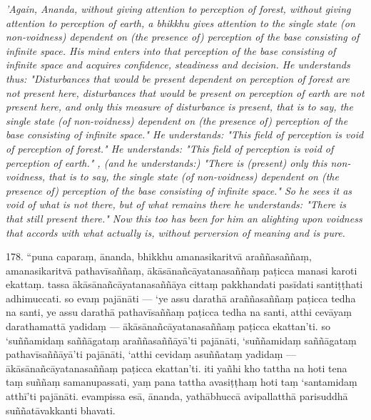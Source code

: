\documentclass[12pt]{article}
\begin{document}
\begin{paracol}{2}
\begin{column}
\begin{flushleft}
 \switchcolumn*
	\end{flushleft} 
{\itshape\footnotesize  'Again, Ananda, without giving attention to perception of forest, without giving attention to perception of earth, a bhikkhu gives attention to the single state (on non-voidness) dependent on (the presence of) perception of the base consisting of infinite space. His mind enters into that perception of the base consisting of infinite space and acquires confidence, steadiness and decision. He understands thus: "Disturbances that would be present dependent on perception of forest are not present here, disturbances that would be present on perception of earth are not present here, and only this measure of disturbance is present, that is to say, the single state (of non-voidness) dependent on (the presence of) perception of the base consisting of infinite space." He understands: "This field of perception is void of perception of forest." He understands: "This field of perception is void of perception of earth." , (and he understands:) "There is (present) only this non-voidness, that is to say, the single state (of non-voidness) dependent on (the presence of) perception of the base consisting of infinite space." So he sees it as void of what is not there, but of what remains there he understands: "There is that still present there." Now this too has been for him an alighting upon voidness that accords with what actually is, without perversion of meaning and is pure.}
\switchcolumn
 	\begin{flushleft}
 178. “puna caparaṃ, ānanda, bhikkhu amanasikaritvā araññasaññaṃ, amanasikaritvā pathavīsaññaṃ, ākāsānañcāyatanasaññaṃ paṭicca manasi karoti ekattaṃ. tassa ākāsānañcāyatanasaññāya cittaṃ pakkhandati pasīdati santiṭṭhati adhimuccati. so evaṃ pajānāti — ‘ye assu darathā araññasaññaṃ paṭicca tedha na santi, ye assu darathā pathavīsaññaṃ paṭicca tedha na santi, atthi cevāyaṃ darathamattā yadidaṃ — ākāsānañcāyatanasaññaṃ paṭicca ekattan’ti. so ‘suññamidaṃ saññāgataṃ araññasaññāyā’ti pajānāti, ‘suññamidaṃ saññāgataṃ pathavīsaññāyā’ti pajānāti, ‘atthi cevidaṃ asuññataṃ yadidaṃ — ākāsānañcāyatanasaññaṃ paṭicca ekattan’ti. iti yañhi kho tattha na hoti tena taṃ suññaṃ samanupassati, yaṃ pana tattha avasiṭṭhaṃ hoti taṃ ‘santamidaṃ atthī’ti pajānāti. evampissa esā, ānanda, yathābhuccā avipallatthā parisuddhā suññatāvakkanti bhavati.
\switchcolumn*
	\end{flushleft}

\end{column}
\end{paracol}
\end{document}
